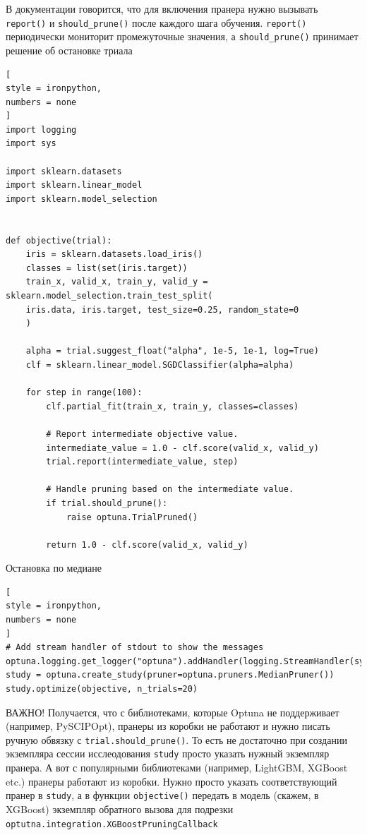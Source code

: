 \documentclass[%
	11pt,
	a4paper,
	utf8,
		]{article}
\begin{document}
В документации говорится, что для включения пранера нужно вызывать \verb|report()| и \verb|should_prune()| после каждого шага обучения. \verb|report()| периодически мониторит промежуточные значения, а \verb|should_prune()| принимает решение об остановке триала
\begin{lstlisting}[
style = ironpython,
numbers = none
]
import logging
import sys

import sklearn.datasets
import sklearn.linear_model
import sklearn.model_selection


def objective(trial):
	iris = sklearn.datasets.load_iris()
	classes = list(set(iris.target))
	train_x, valid_x, train_y, valid_y = sklearn.model_selection.train_test_split(
	iris.data, iris.target, test_size=0.25, random_state=0
	)

	alpha = trial.suggest_float("alpha", 1e-5, 1e-1, log=True)
	clf = sklearn.linear_model.SGDClassifier(alpha=alpha)

	for step in range(100):
		clf.partial_fit(train_x, train_y, classes=classes)
		
		# Report intermediate objective value.
		intermediate_value = 1.0 - clf.score(valid_x, valid_y)
		trial.report(intermediate_value, step)
		
		# Handle pruning based on the intermediate value.
		if trial.should_prune():
			raise optuna.TrialPruned()
		
		return 1.0 - clf.score(valid_x, valid_y)
\end{lstlisting}

Остановка по медиане
\begin{lstlisting}[
style = ironpython,
numbers = none
]
# Add stream handler of stdout to show the messages
optuna.logging.get_logger("optuna").addHandler(logging.StreamHandler(sys.stdout))
study = optuna.create_study(pruner=optuna.pruners.MedianPruner())
study.optimize(objective, n_trials=20)
\end{lstlisting}

{\color{red}
ВАЖНО! Получается, что с библиотеками, которые Optuna не поддерживает (например, PySCIPOpt), пранеры из коробки не работают и нужно писать ручную обвязку с \verb|trial.should_prune()|. То есть не достаточно при создании экземпляра сессии исслеодования \verb|study| просто указать нужный экземпляр пранера. А вот с популярными библиотеками (например, LightGBM, XGBoost etc.) пранеры работают из коробки. Нужно просто указать соответствующий пранер в \verb|study|, а в функции \verb|objective()| передать в модель (скажем, в XGBoost) экземпляр обратного вызова для подрезки \verb|optutna.integration.XGBoostPruningCallback|
}
\end{document}
